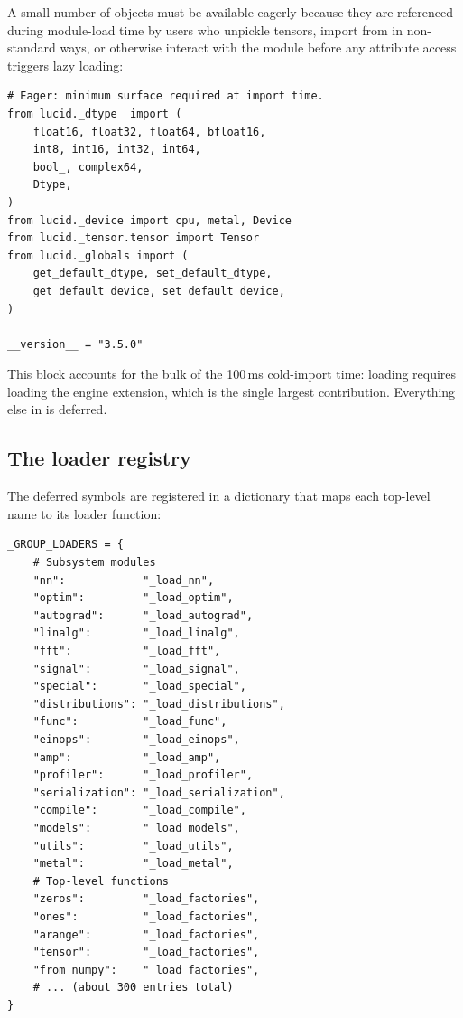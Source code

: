 A small number of objects must be available eagerly because they
are referenced during module-load time by users who unpickle
tensors, import from  in non-standard ways, or
otherwise interact with the module before any attribute access
triggers lazy loading:

\begin{lstlisting}[style=lucid,language=LucidPython]
# Eager: minimum surface required at import time.
from lucid._dtype  import (
    float16, float32, float64, bfloat16,
    int8, int16, int32, int64,
    bool_, complex64,
    Dtype,
)
from lucid._device import cpu, metal, Device
from lucid._tensor.tensor import Tensor
from lucid._globals import (
    get_default_dtype, set_default_dtype,
    get_default_device, set_default_device,
)

__version__ = "3.5.0"
\end{lstlisting}

This block accounts for the bulk of the 100\,ms cold-import time:
loading  requires loading the engine extension, which
is the single largest contribution. Everything else in 
is deferred.

\subsection{The loader registry}
\label{ssec:lazy_imports:loader_registry}

The deferred symbols are registered in a dictionary that maps each
top-level name to its loader function:

\begin{lstlisting}[style=lucid,language=LucidPython]
_GROUP_LOADERS = {
    # Subsystem modules
    "nn":            "_load_nn",
    "optim":         "_load_optim",
    "autograd":      "_load_autograd",
    "linalg":        "_load_linalg",
    "fft":           "_load_fft",
    "signal":        "_load_signal",
    "special":       "_load_special",
    "distributions": "_load_distributions",
    "func":          "_load_func",
    "einops":        "_load_einops",
    "amp":           "_load_amp",
    "profiler":      "_load_profiler",
    "serialization": "_load_serialization",
    "compile":       "_load_compile",
    "models":        "_load_models",
    "utils":         "_load_utils",
    "metal":         "_load_metal",
    # Top-level functions
    "zeros":         "_load_factories",
    "ones":          "_load_factories",
    "arange":        "_load_factories",
    "tensor":        "_load_factories",
    "from_numpy":    "_load_factories",
    # ... (about 300 entries total)
}
\end{lstlisting}

